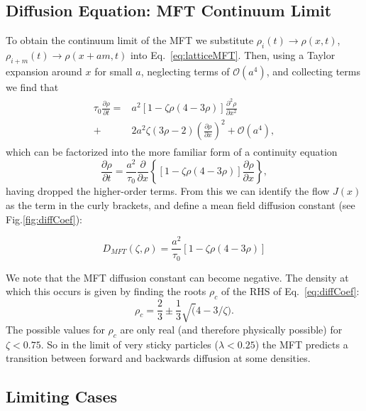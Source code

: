 \documentclass[
reprint, amsmath,amssymb,
]{revtex4-1}
\newcommand{\partDeriv}[2]{\frac{\partial #1}{\partial #2}}
\begin{document}
\subsection{Diffusion Equation: MFT Continuum Limit}
 To obtain the continuum limit of the MFT we substitute $\rho_i(t)
 \rightarrow \rho(x, t)$, $\rho_{i+m}(t) \rightarrow \rho(x + am, t)$
 into Eq.~\ref{eq:latticeMFT}.  Then, using a Taylor expansion around $x$ for
 small $a$, neglecting terms of $\mathcal{O}(a^4)$, and collecting
 terms we find that
\begin{align}
 \begin{split}
  \tau_0 \partDeriv{\rho}{t} =& a^2 \left[ 1-\zeta \rho (4-3\rho)  \right] \partDeriv{^2 \rho}{x^2} 
\\
  +& 2 a^2 \zeta (3\rho-2) \left(\partDeriv{\rho}{x}\right)^2 + \mathcal{O}(a^4) ,
 \end{split}
\end{align}
which can be factorized into the more familiar form of a continuity equation
\begin{equation}
\label{eq:contPDE}
 \partDeriv{\rho}{t} = \frac{a^2}{\tau_0} \partDeriv{}{x} \left\{ \left[1 - \zeta \rho\left(4-3\rho\right) \right] \partDeriv{\rho}{x} \right\},
\end{equation}
having dropped the higher-order terms.  From this we can identify the
flow $J(x)$ as the term in the curly brackets, and define a mean field
diffusion constant (see Fig.\ref{fig:diffCoef}):

\begin{equation} D_{MFT}(\zeta,\rho) =  \frac{a^2}{\tau_0} \left[ 1 - \zeta \rho\left(4-3\rho\right) \right ] \label{eq:diffCoef} \end{equation}

We note that the MFT diffusion constant can become negative. 
The density at
which this occurs is given by finding the roots $\rho_c$ of the RHS of Eq.~\ref{eq:diffCoef}:
\begin{equation}
\rho_c=\frac{2}{3} \pm \frac{1}{3} \sqrt(4-3/\zeta). 
\end{equation}
The possible values for $\rho_c$ are only real (and therefore physically possible) for $\zeta<0.75$.  So in the limit
of very sticky particles ($\lambda<0.25$) the MFT predicts a
transition between forward and backwards diffusion at some densities.  


\subsection{Limiting Cases}
\end{document}
